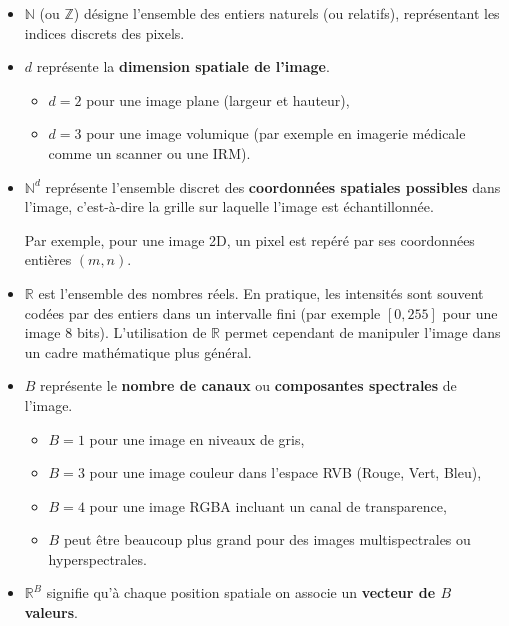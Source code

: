 \begin{itemize}

\item[-] $\mathbb{N}$ (ou $\mathbb{Z}$) désigne l'ensemble des entiers naturels (ou relatifs), représentant les indices discrets des pixels.

\item[-] $d$ représente la \textbf{dimension spatiale de l'image}.

\begin{itemize}
\item[-] $d = 2$ pour une image plane (largeur et hauteur),
\item[-] $d = 3$ pour une image volumique (par exemple en imagerie médicale comme un scanner ou une IRM).
\end{itemize}

\item[-] $\mathbb{N}^d$ représente l'ensemble discret des \textbf{coordonnées spatiales possibles} dans l'image, c'est-à-dire la grille sur laquelle l'image est échantillonnée.

Par exemple, pour une image 2D, un pixel est repéré par ses coordonnées entières $(m,n)$.

\item[-] $\mathbb{R}$ est l'ensemble des nombres réels. En pratique, les intensités sont souvent codées par des entiers dans un intervalle fini (par exemple $[0,255]$ pour une image 8 bits). L'utilisation de $\mathbb{R}$ permet cependant de manipuler l'image dans un cadre mathématique plus général.

\item[-] $B$ représente le \textbf{nombre de canaux} ou \textbf{composantes spectrales} de l'image.

\begin{itemize}
\item[-] $B = 1$ pour une image en niveaux de gris,
\item[-] $B = 3$ pour une image couleur dans l'espace RVB (Rouge, Vert, Bleu),
\item[-] $B = 4$ pour une image RGBA incluant un canal de transparence,
\item[-] $B$ peut être beaucoup plus grand pour des images multispectrales ou hyperspectrales.
\end{itemize}

\item[-] $\mathbb{R}^B$ signifie qu'à chaque position spatiale on associe un \textbf{vecteur de $B$ valeurs}.
\end{itemize}

